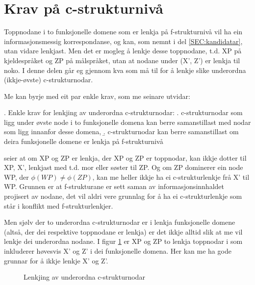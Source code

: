 \documentclass[11pt,a4paper,oneside,draft]{book}
\begin{document}
\section{Krav på c-strukturnivå}
\label{sec-3.7}

\label{SEC:subnode}

Toppnodane i to funksjonelle domene som er lenkja på f-strukturnivå
vil ha ein informasjonsmessig korrespondanse, og kan, som nemnt i del
\ref{SEC:kandidatar}, utan vidare lenkjast. Men det er mogleg å lenkje
desse toppnodane, t.d. XP på kjeldespråket og ZP på målspråket, utan
at nodane under (X', Z') er lenkja til noko. I denne delen går eg
gjennom kva som må til for å lenkje slike underordna (ikkje-øvste)
c-strukturnodar.

Me kan byrje med eit par enkle krav, som me seinare utvidar:

\ex. Enkle krav for lenkjing av underordna c-strukturnodar:
\a. \label{subnodekrav-innan-domene} c-strukturnodar som ligg under øvste node i to funksjonelle
    domena kan berre samanstillast med nodar som ligg innanfor desse
    domena,
\b. \label{subnodekrav-f-lenkja} c-strukturnodar kan berre samanstillast om deira funksjonelle
    domene er lenkja på f-strukturnivå

\Last[a] seier at om XP og ZP er lenkja, der XP og ZP er toppnodar,
kan ikkje dotter til XP, X', lenkjast med t.d. mor eller søster til
ZP. Og om ZP dominerer ein node WP, der $\phi(WP) \neq \phi(ZP)$, kan
me heller ikkje ha ei c-strukturlenkje frå X' til WP. Grunnen er at
f-strukturane er sett saman av informasjonsinnhaldet projisert av
nodane, det vil aldri vere grunnlag for å ha ei c-strukturlenkje som
står i konflikt med f-strukturlenkjer.

Men sjølv der to underordna c-strukturnodar er i lenkja funksjonelle
domene (altså, der dei respektive toppnodane er lenkja) er det ikkje
alltid slik at me vil lenkje dei underordna nodane. I figur
\ref{fig:subnode} er XP og ZP to lenkja toppnodar i som inkluderer
høvesvis X' og Z' i dei funksjonelle domena. Her kan me ha gode
grunnar for å ikkje lenkje X' og Z'. 

\begin{figure}[htp]
\centering
   \caption{Lenkjing av underordna c-strukturnodar}
   \label{fig:subnode}
  \end{figure}
\end{document}
